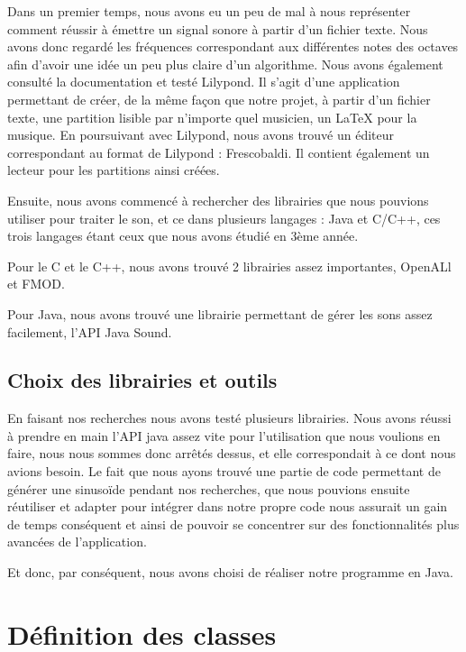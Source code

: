 \documentclass{EPUProjetPeiP}
\begin{document}
Dans un premier temps, nous avons eu un peu de mal à nous représenter comment réussir à émettre un signal sonore à partir d'un fichier texte. Nous avons donc regardé les fréquences correspondant aux différentes notes des octaves afin d'avoir une idée un peu plus claire d'un algorithme. Nous avons également consulté la documentation et testé Lilypond. Il s'agit d'une application permettant de créer, de la même façon que notre projet, à partir d'un fichier texte,  une partition lisible par n'importe quel musicien, un LaTeX pour la musique. En poursuivant avec Lilypond, nous avons trouvé un éditeur correspondant au format de Lilypond : Frescobaldi. Il contient également un lecteur pour les partitions ainsi créées.

Ensuite, nous avons commencé à rechercher des librairies que nous pouvions utiliser pour traiter le son, et ce dans plusieurs langages : Java et C/C++, ces trois langages étant ceux que nous avons étudié en 3ème année. 

Pour le C et le C++, nous avons trouvé 2 librairies assez importantes, OpenALl et FMOD.

Pour Java, nous avons trouvé une librairie permettant de gérer les sons assez facilement, l'API Java Sound.

\subsection{Choix des librairies et outils} 

En faisant nos recherches nous avons testé plusieurs librairies. Nous avons réussi à prendre en main l'API java assez vite pour l'utilisation que nous voulions en faire, nous nous sommes donc arrêtés dessus, et elle correspondait à ce dont nous avions besoin. Le fait que nous ayons trouvé une partie de code permettant de générer une sinusoïde pendant nos recherches, que nous pouvions ensuite réutiliser et adapter pour intégrer dans notre propre code nous assurait un gain de temps conséquent et ainsi de pouvoir se concentrer sur des fonctionnalités plus avancées de l'application.

Et donc, par conséquent, nous avons choisi de réaliser notre programme en Java.

\section{Définition des classes}
\end{document}
